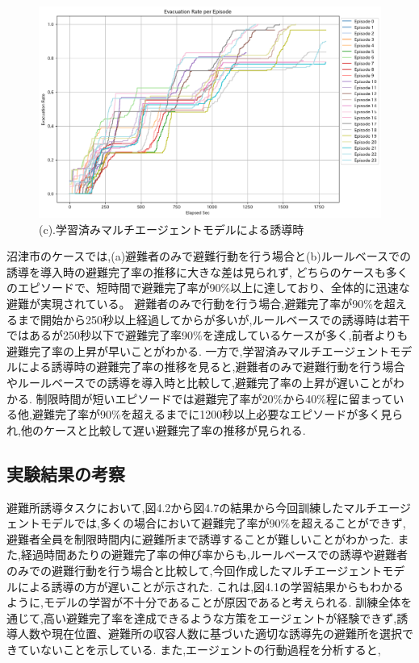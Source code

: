 \begin{figure}[H]
  \vspace{1em} %
  \begin{minipage}{0.65\textwidth}
      \centering
      \includegraphics[width=\textwidth]{Figures/Numazu-AgentModel-ERE.png} %
      \caption{(c).学習済みマルチエージェントモデルによる誘導時}
      \label{fig:graph-c}
  \end{minipage}
\end{figure}
沼津市のケースでは,(a)避難者のみで避難行動を行う場合と(b)ルールベースでの誘導を導入時の避難完了率の推移に大きな差は見られず,
どちらのケースも多くのエピソードで、短時間で避難完了率が90\%以上に達しており、全体的に迅速な避難が実現されている。
避難者のみで行動を行う場合,避難完了率が90\%を超えるまで開始から250秒以上経過してからが多いが,ルールベースでの誘導時は若干ではあるが250秒以下で避難完了率90\%を達成しているケースが多く,前者よりも避難完了率の上昇が早いことがわかる.
一方で,学習済みマルチエージェントモデルによる誘導時の避難完了率の推移を見ると,避難者のみで避難行動を行う場合やルールベースでの誘導を導入時と比較して,避難完了率の上昇が遅いことがわかる.
制限時間が短いエピソードでは避難完了率が20\%から40\%程に留まっている他,避難完了率が90\%を超えるまでに1200秒以上必要なエピソードが多く見られ,他のケースと比較して遅い避難完了率の推移が見られる.

\subsection{実験結果の考察}
避難所誘導タスクにおいて,図4.2から図4.7の結果から今回訓練したマルチエージェントモデルでは,多くの場合において避難完了率が90\%を超えることができず,避難者全員を制限時間内に避難所まで誘導することが難しいことがわかった.
また,経過時間あたりの避難完了率の伸び率からも,ルールベースでの誘導や避難者のみでの避難行動を行う場合と比較して,今回作成したマルチエージェントモデルによる誘導の方が遅いことが示された.
これは,図4.1の学習結果からもわかるように,モデルの学習が不十分であることが原因であると考えられる.
訓練全体を通じて,高い避難完了率を達成できるような方策をエージェントが経験できず,誘導人数や現在位置、避難所の収容人数に基づいた適切な誘導先の避難所を選択できていないことを示している.
また,エージェントの行動過程を分析すると,